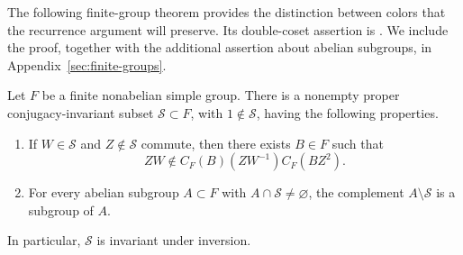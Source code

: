 The following finite-group theorem provides the distinction between colors
that the recurrence argument will preserve. Its double-coset assertion is
\cite[Lemma~5.2 and Section~6]{MPNF}. We include the proof, together with
the additional assertion about abelian subgroups, in
Appendix~\ref{sec:finite-groups}.

\begin{theorem}\label{fin:obstruction}
Let $F$ be a finite nonabelian simple group. There is a nonempty proper
conjugacy-invariant subset $\mathcal S\subset F$, with $1\notin\mathcal S$,
having the following properties.
\begin{enumerate}[label=\textup{(\roman*)}]
\item If $W\in\mathcal S$ and $Z\notin\mathcal S$ commute, then there
exists $B\in F$ such that
\[
 ZW\notin C_F(B)(ZW^{-1})C_F(BZ^2).
\]
\item For every abelian subgroup $A\subset F$ with
$A\cap\mathcal S\ne\varnothing$, the complement $A\setminus\mathcal S$
is a subgroup of $A$.
\end{enumerate}
In particular, $\mathcal S$ is invariant under inversion.
\end{theorem}
